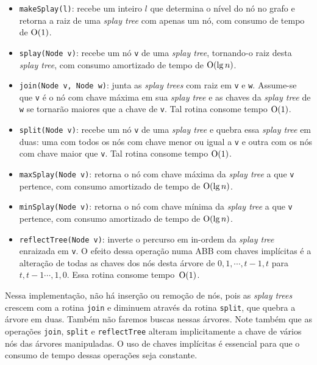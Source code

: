 \begin{itemize}
    \item \texttt{makeSplay(l)}: {\color{red} recebe um inteiro $l$ que determina o nível do nó no grafo e} retorna a raiz de uma \emph{splay tree} com apenas um nó, com consumo de tempo de $\mathrm{O}(1)$.  

    \item \texttt{splay(Node v)}: recebe um nó \texttt{v} de uma \emph{splay tree}, tornando-o raiz desta \emph{splay tree}, com consumo amortizado de tempo de $\mathrm{O}(\lg n)$.  

    \item \texttt{join(Node v, Node w)}: junta as \emph{splay trees} com raiz em \texttt{v} e \texttt{w}. Assume-se que \texttt{v} é o nó com chave máxima em sua \emph{splay tree} e as chaves da \emph{splay tree} de \texttt{w} se tornarão maiores que a chave de \texttt{v}. Tal rotina consome tempo $\mathrm{O}(1)$.  

    \item \texttt{split(Node v)}: recebe um nó \texttt{v} de uma \emph{splay tree} e quebra essa \emph{splay tree} em duas: uma com todos os nós com chave menor ou igual a \texttt{v} e outra com os nós com chave maior que \texttt{v}. Tal rotina consome tempo $\mathrm{O}(1)$.  

    \item \texttt{maxSplay(Node v)}: retorna o nó com chave máxima da \emph{splay tree} a que \texttt{v} pertence, com consumo amortizado de tempo de $\mathrm{O}(\lg n)$.  

    \item \texttt{minSplay(Node v)}: retorna o nó com chave mínima da \emph{splay tree} a que \texttt{v} pertence, com consumo amortizado de tempo de $\mathrm{O}(\lg n)$.  

    \item \texttt{reflectTree(Node v)}: inverte o percurso em in-ordem da \emph{splay tree} enraizada em \texttt{v}. O efeito dessa operação numa ABB com chaves implícitas é a alteração de todas as chaves dos nós desta árvore de $0, 1, \cdots, t{-}1,t$ para $t,t{-}1\cdots, 1, 0$. Essa rotina consome tempo~$\mathrm{O}(1)$.  


\end{itemize}

Nessa implementação, não há inserção ou remoção de nós, pois as \emph{splay trees} crescem com a rotina \texttt{join} e diminuem através da rotina \texttt{split}, que quebra a árvore em duas. Também não faremos buscas nessas árvores. Note também que as operações \texttt{join}, \texttt{split} e \texttt{reflectTree} alteram implicitamente a chave de vários nós das árvores manipuladas. O uso de chaves implícitas é essencial para que o consumo de tempo dessas operações seja constante.  

